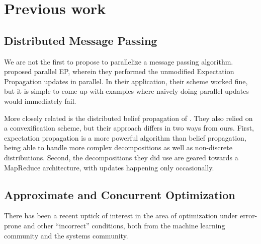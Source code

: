 \documentclass[12pt,leqno,twoside]{article}
\begin{document}
\section{Previous work}

\subsection{Distributed Message Passing}

We are not the first to propose to parallelize a message passing
algorithm. \citet{CsekeHeskes2010} proposed parallel EP, wherein
they performed the unmodified Expectation Propagation updates in
parallel. In their application, their scheme worked fine, but it
is simple to come up with examples where naively doing parallel
updates would immediately fail.

More closely related is the distributed belief propagation of
\citet{schwing2011distributed}. They also relied on a convexification scheme, but
their approach differs in two ways from ours. First, expectation
propagation is a more powerful algorithm than belief propagation,
being able to handle more complex decompositions as well as
non-discrete distributions. Second, the decompositions they did use
are geared towards a MapReduce architecture, with updates happening
only occasionally. 

\subsection{Approximate and Concurrent Optimization}

There has been a recent uptick of interest in the area of optimization
under error-prone and other ``incorrect'' conditions, both from the
machine learning community and the systems community.
\end{document}
